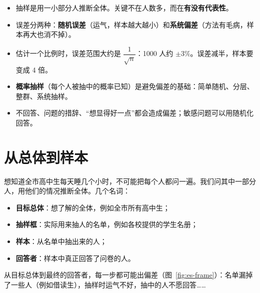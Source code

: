 
\begin{keypoints}
\begin{itemize}
  \item 抽样是用一小部分人推断全体。关键不在人数多，而在\textbf{有没有代表性}。
  \item 误差分两种：\textbf{随机误差}（运气，样本越大越小）和\textbf{系统偏差}（方法有毛病，样本再大也消不掉）。
  \item 估计一个比例时，误差范围大约是 $\dfrac1{\sqrt n}$：1000 人约 $\pm3\%$。误差减半，样本要变成 4 倍。
  \item \textbf{概率抽样}（每个人被抽中的概率已知）是避免偏差的基础：简单随机、分层、整群、系统抽样。
  \item 不回答、问题的措辞、“想显得好一点”都会造成偏差；敏感问题可以用随机化回答。
\end{itemize}
\end{keypoints}

\section{从总体到样本}

想知道全市高中生每天睡几个小时，不可能把每个人都问一遍。我们问其中一部分人，用他们的情况推断全体。几个名词：
\begin{itemize}
  \item \textbf{目标总体}：想了解的全体，例如全市所有高中生；
  \item \textbf{抽样框}：实际用来抽人的名单，例如各校提供的学生名册；
  \item \textbf{样本}：从名单中抽出来的人；
  \item \textbf{回答者}：样本中真正回答了问卷的人。
\end{itemize}
从目标总体到最终的回答者，每一步都可能出偏差（图~\ref{fig:es-frame}）：名单漏掉了一些人（例如借读生），抽样时运气不好，抽中的人不愿回答……

